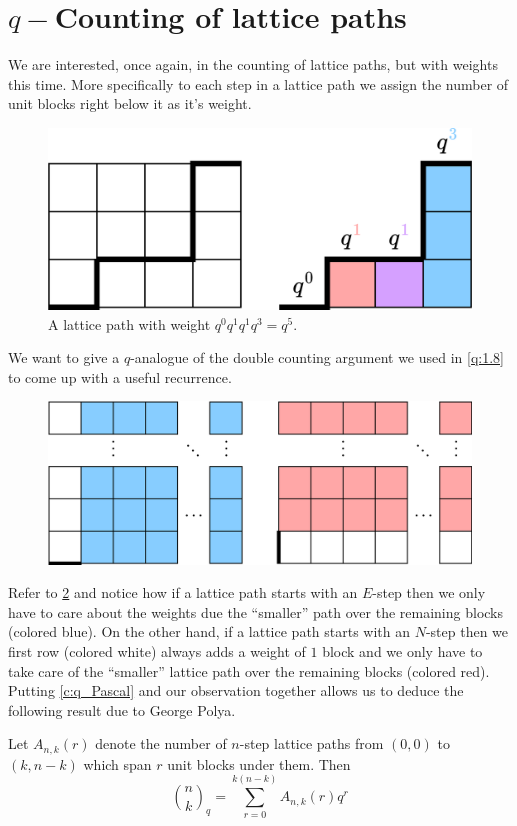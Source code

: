\section{\texorpdfstring{$q-$}-Counting of lattice paths}
We are interested, once again, in the counting of lattice paths, but with weights this time. More specifically to each step in a lattice path we assign the number of unit blocks right below it as it's weight. 
\begin{figure}[H]
    \centering
    \includegraphics[width=0.65\linewidth]{Images/Figure27.png}
    \caption{A lattice path with weight $q^0q^1q^1q^3=q^5$.}
    \label{f:F2L}
\end{figure}
We want to give a $q$-analogue of the double counting argument we used in \cref{q:1.8} to come up with a useful recurrence. 
\begin{figure}[H]
    \centering
    \includegraphics[width=0.65\linewidth]{Images/Figure28.png}
    \caption{}
    \label{fig:Cayley_Rec}
\end{figure}
Refer to \cref{fig:Cayley_Rec} and notice how if a lattice path starts with an $E$-step then we only have to care about the weights due the ``smaller'' path over the remaining blocks (colored blue). On the other hand, if a lattice path starts with an $N$-step then we first row (colored white) always adds a weight of $1$ block and we only have to take care of the ``smaller'' lattice path over the remaining blocks (colored red). Putting \cref{c:q_Pascal} and our observation together allows us to deduce the following result due to George Polya.
\begin{theorem}
Let $A_{n,k}(r)$ denote the number of $n$-step lattice paths from $(0,0)$ to $(k,n-k)$ which span $r$ unit blocks under them. Then 
\[
\binom{n}{k}_q = \sum_{r=0}^{k(n-k)}A_{n,k}(r)q^r
\]
\end{theorem}
